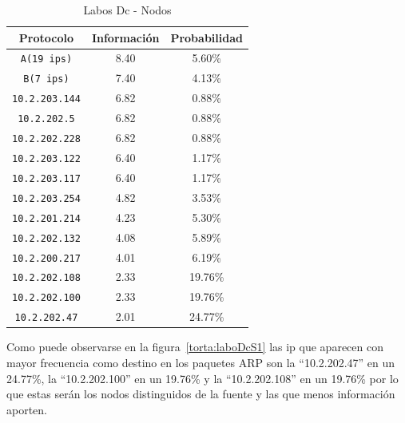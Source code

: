 \documentclass[final,inline,narroweqnarray,a4paper]{ieee}
\begin{document}
\begin{table}[H]
    \begin{center}
        \begin{tabular}{|c|c|c|}
            \hline
            \textbf{Protocolo} & \textbf{Información} & \textbf{Probabilidad} \\ \hline
            \texttt{A(19 ips)}    &8.40        & 5.60\%     \\ \hline
            \texttt{B(7 ips)}     &7.40        & 4.13\%     \\ \hline
            \texttt{10.2.203.144} &6.82        & 0.88\%     \\ \hline
            \texttt{10.2.202.5}   &6.82        & 0.88\%     \\ \hline
            \texttt{10.2.202.228} &6.82        & 0.88\%     \\ \hline
            \texttt{10.2.203.122} &6.40        & 1.17\%     \\ \hline
            \texttt{10.2.203.117} &6.40        & 1.17\%     \\ \hline
            \texttt{10.2.203.254} &4.82        & 3.53\%     \\ \hline
            \texttt{10.2.201.214} &4.23        & 5.30\%     \\ \hline
            \texttt{10.2.202.132} &4.08        & 5.89\%     \\ \hline
            \texttt{10.2.200.217} &4.01        & 6.19\%     \\ \hline
            \texttt{10.2.202.108} &2.33        & 19.76\%     \\ \hline
            \texttt{10.2.202.100} &2.33        & 19.76\%     \\ \hline
            \texttt{10.2.202.47}  &2.01        & 24.77\%     \\ \hline   
        \end{tabular}
        \caption{Labos Dc - Nodos}
        \label{table:laboDcS1}
    \end{center}
\end{table}

Como puede observarse en la figura~\ref{torta:laboDcS1} las ip que aparecen con mayor frecuencia como destino en los paquetes ARP son la ``10.2.202.47'' en un 24.77\%, la ``10.2.202.100'' en un 19.76\% y la ``10.2.202.108'' en un 19.76\% por lo que estas serán los nodos distinguidos de la fuente y las que menos información aporten.
\end{document}
